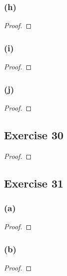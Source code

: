 \documentclass[14pt]{extarticle}
\begin{document}
\subsubsection{(h)}

\begin{proof}

\end{proof}

\subsubsection{(i)}

\begin{proof}

\end{proof}

\subsubsection{(j)}

\begin{proof}

\end{proof}

\subsection{Exercise 30}

\begin{proof}

\end{proof}

\subsection{Exercise 31}

\subsubsection{(a)}

\begin{proof}

\end{proof}

\subsubsection{(b)}

\begin{proof}

\end{proof}
\end{document}
